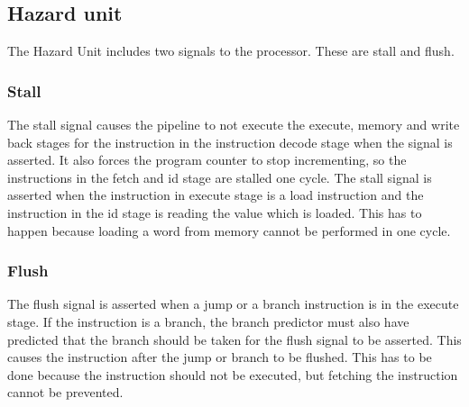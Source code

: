 \subsection{Hazard unit}
\label{sec:hazard_unit}

The Hazard Unit includes two signals to the processor. These are stall and flush. 

\subsubsection{Stall} The stall signal causes the pipeline to not execute the execute, memory and write back stages for the instruction in the instruction decode stage when the signal is asserted. It also forces the program counter to stop incrementing, so the instructions in the fetch and id stage are stalled one cycle. The stall signal is asserted when the instruction in execute stage is a load instruction and the instruction in the id stage is reading the value which is loaded. This has to happen because loading a word from memory cannot be performed in one cycle.

\subsubsection{Flush} The flush signal is asserted when a jump or a branch instruction is in the execute stage. If the instruction is a branch, the branch predictor must also have predicted that the branch should be taken for the flush signal to be asserted. This causes the instruction after the jump or branch to be flushed. This has to be done because the instruction should not be executed, but fetching the instruction cannot be prevented. 